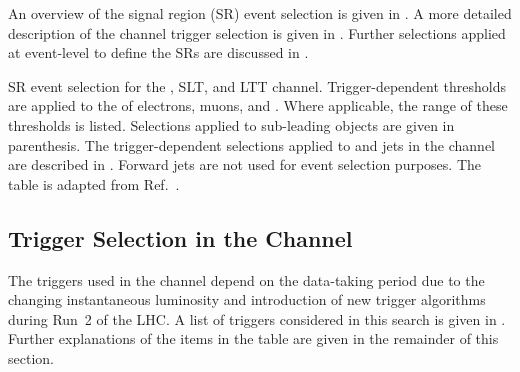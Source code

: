 
An overview of the signal region (SR) event selection is given in
. A more detailed description of the \hadhad channel
trigger selection is given in . Further
selections applied at event-level to define the SRs are discussed in
.

\begin{table}[htbp]
  \centering

  \caption[SR event selection for the \hadhad, \lephad SLT, and \lephad LTT
  channel.]{SR event selection for the \hadhad, \lephad SLT, and \lephad LTT
    channel. Trigger-dependent thresholds are applied to the \pT of electrons,
    muons, and \tauhadvis. Where applicable, the range of these thresholds is
    listed. Selections applied to \pT sub-leading objects are given in
    parenthesis. The trigger-dependent selections applied to \tauhadvis and jets
    in the \hadhad channel are described in
    . Forward jets are not used for event
    selection purposes. The table is adapted from Ref.~\cite{HDBS-2018-40}.}%
  \label{tab:event_selection}

  \resizebox{\textwidth}{!}{
    
  }
\end{table}


\subsection{Trigger Selection in the \hadhad Channel}%
\label{sec:trigger}%
\label{sec:hadhad_trigger_selection}

The triggers used in the \hadhad channel depend on the data-taking period due to
the changing instantaneous luminosity and introduction of new trigger algorithms
during Run~2 of the LHC.
A list of triggers considered in this search is given in
. Further explanations of the items in the table are
given in the remainder of this section.

